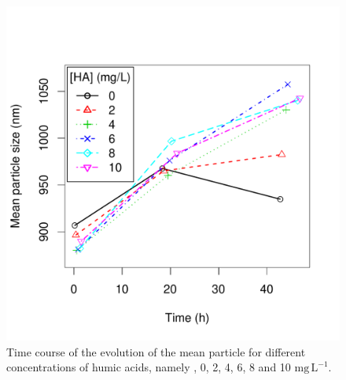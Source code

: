 \documentclass[journal=langd5,manuscript=article]{achemso}
\begin{document}
 \begin{figure}
  \includegraphics[width=\linewidth]{Figures/mean_particle_size.pdf}
  \caption{Time course of the evolution of the mean particle for different concentrations of humic acids, namely , 0, 2, 4, 6, 8 and 10 $\mathrm{mg\,L^{-1}}$.} 
  \label{fgr:meansize}
\end{figure}


\end{document}
